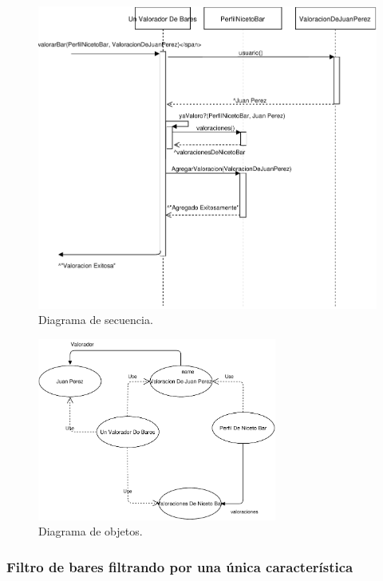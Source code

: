 \begin{figure}[H]
  \centering
  \includegraphics[width=\textwidth]{diagramas/secuencia_1.pdf}
  \caption{\normalfont Diagrama de secuencia.}
\end{figure}

\begin{figure}[H]
  \centering
  \includegraphics[width=0.7\textwidth]{diagramas/objetos_1.pdf}
  \caption{\normalfont Diagrama de objetos.}
\end{figure}


\subsubsection{Filtro de bares filtrando por una única característica}


